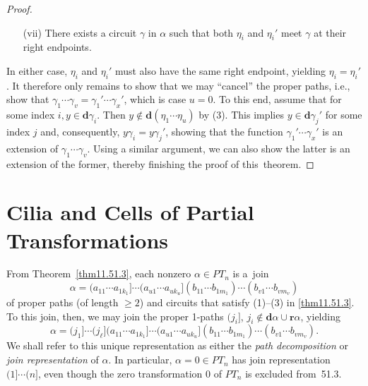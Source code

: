 \documentclass{surv-l}
\numberwithin{equation}{section}
\numberwithin{table}{section}
\numberwithin{figure}{section}
\theoremstyle{definition}
\begin{document}
\begin{proof}
\begin{enumerate}
\item[(vii)] There exists a circuit $\gamma$ in $\alpha$ such that both
$\eta_{i}$ and $\eta_{i}'$ meet $\gamma$ at their right endpoints.
\end{enumerate}
In either case, $\eta_{i}$ and $\eta_{i}'$ must also have the same
right endpoint, yielding $\eta_{i}=\eta_{i}'$. It therefore only
remains to show that we may ``cancel'' the proper paths, i.e.,
show that $\gamma_{1}\cdots\gamma_{v}=\gamma_{1}'\cdots\gamma_{x}'$, which
is case $u=0$. To this end, assume that for some index $i, y\in
\mathbf{d}\gamma_{i}$. Then $y\not\in
\mathbf{d}(\eta_{1}\cdots\eta_{u})$ by (3). This implies $y\in
\mathbf{d}\gamma_{j}'$ for some index $j$ and, consequently,
$y\gamma_{i}=y\gamma_{j}'$, showing that the function
$\gamma_{1}'\cdots\gamma_{x}'$ is an extension of
$\gamma_{1}\cdots\gamma_{v}$. Using a similar argument, we can
also show the latter is an extension of the former, thereby
finishing the proof of this~theorem.
\end{proof}

\section{Cilia and Cells of Partial Transformations}\label{sec11.52}

From Theorem~\ref{thm11.51.3}, each nonzero $\alpha\in PT_{n}$ is
a~join
\[
\alpha=(a_{11}\cdots a_{1k_{1}}]\cdots(a_{u1}\cdots a_{uk_{u}}]
(b_{11}\cdots b_{1m_{1}})\cdots(b_{v1}\cdots b_{vm_{v}})
\]
of proper paths (of length $\geq 2$) and circuits that satisfy
(1)--(3) in \ref{thm11.51.3}. To this join, then, we may join the
proper 1-paths $(j_{i}]$, $j_{i}\not\in \mathbf{d}\alpha\cup
\mathbf{r}\alpha$, yielding
\[
\alpha=(j_{1}]\cdots(j_{\ell}](a_{11}\cdots
a_{1k_{1}}]\cdots(a_{u1}\cdots a_{uk_{u}}](b_{11}\cdots
b_{1m_{1}})\cdots(b_{v1}\cdots b_{vm_{v}}).
\]
We shall refer to this unique representation as either the
\emph{path decomposition} or
\emph{join representation} of $\alpha$. In particular,
$\alpha=0\in PT_{n}$ has join representation $(1]\cdots (n]$, even
though the zero transformation $0$ of $PT_{n}$ is excluded
from~51.3.
\end{document}
